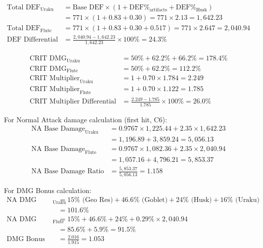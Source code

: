 \documentclass[12pt,a4paper]{article}
\begin{document}
\begin{align}
\text{Total DEF}_{\text{Uraku}} &= \text{Base DEF} \times (1 + \text{DEF\%}_{\text{artifacts}} + \text{DEF\%}_{\text{Husk}}) \\
&= 771 \times (1 + 0.83 + 0.30) = 771 \times 2.13 = 1,642.23 \\
\text{Total DEF}_{\text{Flute}} &= 771 \times (1 + 0.83 + 0.30 + 0.517) = 771 \times 2.647 = 2,040.94 \\
\text{DEF Differential} &= \frac{2,040.94 - 1,642.23}{1,642.23} \times 100\% = 24.3\%
\end{align}

\begin{align}
\text{CRIT DMG}_{\text{Uraku}} &= 50\% + 62.2\% + 66.2\% = 178.4\% \\
\text{CRIT DMG}_{\text{Flute}} &= 50\% + 62.2\% = 112.2\% \\
\text{CRIT Multiplier}_{\text{Uraku}} &= 1 + 0.70 \times 1.784 = 2.249 \\
\text{CRIT Multiplier}_{\text{Flute}} &= 1 + 0.70 \times 1.122 = 1.785 \\
\text{CRIT Multiplier Differential} &= \frac{2.249 - 1.785}{1.785} \times 100\% = 26.0\%
\end{align}

For Normal Attack damage calculation (first hit, C6):
\begin{align}
\text{NA Base Damage}_{\text{Uraku}} &= 0.9767 \times 1,225.44 + 2.35 \times 1,642.23 \\
&= 1,196.89 + 3,859.24 = 5,056.13 \\
\text{NA Base Damage}_{\text{Flute}} &= 0.9767 \times 1,082.36 + 2.35 \times 2,040.94 \\
&= 1,057.16 + 4,796.21 = 5,853.37 \\
\text{NA Base Damage Ratio} &= \frac{5,853.37}{5,056.13} = 1.158
\end{align}

For DMG Bonus calculation:
\begin{align}
\text{NA DMG Bonus}_{\text{Uraku}} &= 15\% \text{ (Geo Res)} + 46.6\% \text{ (Goblet)} + 24\% \text{ (Husk)} + 16\% \text{ (Uraku)} \\
&= 101.6\% \\
\text{NA DMG Bonus}_{\text{Flute}} &= 15\% + 46.6\% + 24\% + 0.29\% \times 2,040.94 \\
&= 85.6\% + 5.9\% = 91.5\% \\
\text{DMG Bonus Ratio} &= \frac{2.016}{1.915} = 1.053
\end{align}
\end{document}
